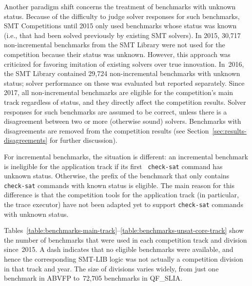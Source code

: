 \documentclass[twoside,11pt]{article}
\begin{document}
Another paradigm shift concerns the treatment of benchmarks with
unknown status.  Because of the difficulty to judge solver responses
for such benchmarks, SMT Competitions until 2015 only used benchmarks
whose status was known (i.e., that had been solved previously by
existing SMT solvers).  In 2015, 30,717 non-incremental benchmarks
from the SMT Library were not used for the competition because their
status was unknown.  However, this approach was criticized for
favoring imitation of existing solvers over true innovation.  In~2016,
the SMT Library contained 29,724 non-incremental benchmarks with
unknown status; solver performance on these was evaluated but reported
separately.  Since 2017, all non-incremental benchmarks are eligible
for the competition's main track regardless of status, and they
directly affect the competition results.  Solver responses for such
benchmarks are assumed to be correct, unless there is a disagreement
between two or more (otherwise sound) solvers.  Benchmarks with
disagreements are removed from the competition results (see
Section~\ref{sec:results-disagreements} for further discussion).

For incremental benchmarks, the situation is different: an incremental
benchmark is ineligible for the application track if its first {\tt
  check-sat} command has unknown status.  Otherwise, the prefix of the
benchmark that only contains {\tt check-sat} commands with known
status is eligible.  The main reason for this difference is that the
competition tools for the application track (in particular, the trace
executor) have not been adapted yet to support {\tt check-sat}
commands with unknown status.

Tables~\ref{table:benchmarks-main-track}--\ref{table:benchmarks-unsat-core-track}
show the number of benchmarks that were used in each competition track
and division since~2015.  A dash indicates that no eligible benchmarks
were available, and hence the corresponding SMT-LIB logic was not
actually a competition division in that track and year.  The size of
divisions varies widely, from just one benchmark in ABVFP to~72,705
benchmarks in QF\_SLIA.
\end{document}
